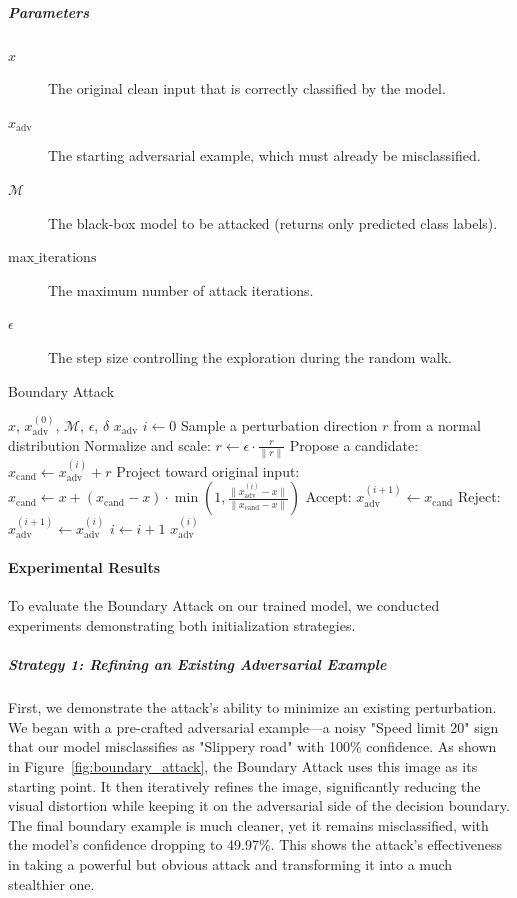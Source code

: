 \documentclass[../main.tex]{subfiles}
\begin{document}
\subparagraph{Parameters}
\begin{description}
  \item[$x$] The original clean input that is correctly classified by the model.
  \item[$x_{\mathrm{adv}}$] The starting adversarial example, which must already be misclassified.
  \item[$\mathcal{M}$] The black-box model to be attacked (returns only predicted class labels).
  \item[$\text{max\_iterations}$] The maximum number of attack iterations.
  \item[$\epsilon$] The step size controlling the exploration during the random walk.
\end{description}




\begin{breakablealgorithm}{Boundary Attack}
\label{alg:boundary_attack_core}
\begin{algorithmic}[1]
\Require $x$, $x_{\mathrm{adv}}^{(0)}$, $\mathcal{M}$, $\epsilon$, $\delta$
\Ensure $x_{\mathrm{adv}}$
\State $i \gets 0$
    \State Sample a perturbation direction $r$ from a normal distribution
    \State Normalize and scale: $r \gets \epsilon \cdot \frac{r}{\|r\|}$
    \State Propose a candidate: $x_{\mathrm{cand}} \gets x_{\mathrm{adv}}^{(i)} + r$
    \State Project toward original input: $x_{\mathrm{cand}} \gets x + (x_{\mathrm{cand}} - x) \cdot \min\left(1, \frac{\|x_{\mathrm{adv}}^{(i)} - x\|}{\|x_{\mathrm{cand}} - x\|} \right)$
        \State Accept: $x_{\mathrm{adv}}^{(i+1)} \gets x_{\mathrm{cand}}$
    \Else
        \State Reject: $x_{\mathrm{adv}}^{(i+1)} \gets x_{\mathrm{adv}}^{(i)}$
    \EndIf
    \State $i \gets i + 1$
\EndWhile
\State \Return $x_{\mathrm{adv}}^{(i)}$
\end{algorithmic}
\end{breakablealgorithm}
\paragraph{Experimental Results}
To evaluate the Boundary Attack on our trained model, we conducted experiments demonstrating both initialization strategies.

\subparagraph{Strategy 1: Refining an Existing Adversarial Example}
First, we demonstrate the attack's ability to minimize an existing perturbation. We began with a pre-crafted adversarial example—a noisy "Speed limit 20" sign that our model misclassifies as "Slippery road" with 100\% confidence. As shown in Figure~\ref{fig:boundary_attack}, the Boundary Attack uses this image as its starting point. It then iteratively refines the image, significantly reducing the visual distortion while keeping it on the adversarial side of the decision boundary. The final boundary example is much cleaner, yet it remains misclassified, with the model's confidence dropping to 49.97\%. This shows the attack's effectiveness in taking a powerful but obvious attack and transforming it into a much stealthier one.
\end{document}
